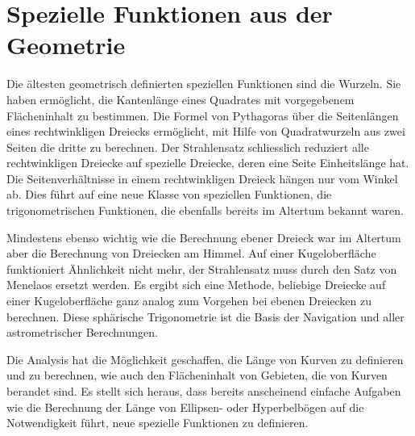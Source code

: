 %
%
%
\chapter{Spezielle Funktionen aus der Geometrie
\label{buch:chapter:geometrie}}
\rhead{}

Die ältesten geometrisch definierten speziellen Funktionen
sind die Wurzeln.
Sie haben ermöglicht, die Kantenlänge eines Quadrates mit vorgegebenem
Flächeninhalt zu bestimmen.
Die Formel von Pythagoras über die Seitenlängen eines rechtwinkligen
Dreiecks ermöglicht, mit Hilfe von Quadratwurzeln aus zwei Seiten
die dritte zu berechnen.
Der Strahlensatz schliesslich reduziert alle rechtwinkligen
Dreiecke auf spezielle Dreiecke, deren eine Seite Einheitslänge 
hat.
Die Seitenverhältnisse in einem rechtwinkligen Dreieck hängen nur 
vom Winkel ab.
Dies führt auf eine neue Klasse von speziellen Funktionen,
die trigonometrischen Funktionen,
die ebenfalls bereits im Altertum bekannt waren.

Mindestens ebenso wichtig wie die Berechnung ebener Dreieck
war im Altertum aber die Berechnung von Dreiecken am Himmel.
Auf einer Kugeloberfläche funktioniert Ähnlichkeit nicht mehr,
der Strahlensatz muss durch den Satz von Menelaos ersetzt werden.
Es ergibt sich eine Methode, beliebige Dreiecke auf einer Kugeloberfläche
ganz analog zum Vorgehen bei ebenen Dreiecken zu berechnen.
Diese sphärische Trigonometrie ist die Basis der Navigation
und aller astrometrischer Berechnungen.

Die Analysis hat die Möglichkeit geschaffen, die Länge von Kurven
zu definieren und zu berechnen, wie auch den Flächeninhalt von
Gebieten, die von Kurven berandet sind.
Es stellt sich heraus, dass bereits anscheinend einfache Aufgaben
wie die Berechnung der Länge von Ellipsen- oder Hyperbelbögen auf
die Notwendigkeit führt, neue spezielle Funktionen zu definieren.








